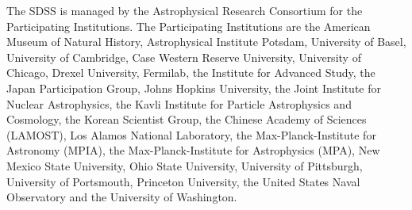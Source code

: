 \documentclass[useAMS,usenatbib]{mn2e}
\begin{document}
The SDSS is managed by the Astrophysical Research Consortium for the
Participating Institutions. The Participating Institutions are the American
Museum of Natural History, Astrophysical Institute Potsdam, University of
Basel, University of Cambridge, Case Western Reserve University, University of
Chicago, Drexel University, Fermilab, the Institute for Advanced Study, the
Japan Participation Group, Johns Hopkins University, the Joint Institute for
Nuclear Astrophysics, the Kavli Institute for Particle Astrophysics and
Cosmology, the Korean Scientist Group, the Chinese Academy of Sciences
(LAMOST), Los Alamos National Laboratory, the Max-Planck-Institute for
Astronomy (MPIA), the Max-Planck-Institute for Astrophysics (MPA), New Mexico
State University, Ohio State University, University of Pittsburgh, University
of Portsmouth, Princeton University, the United States Naval Observatory and
the University of Washington. 


  
\end{document}

